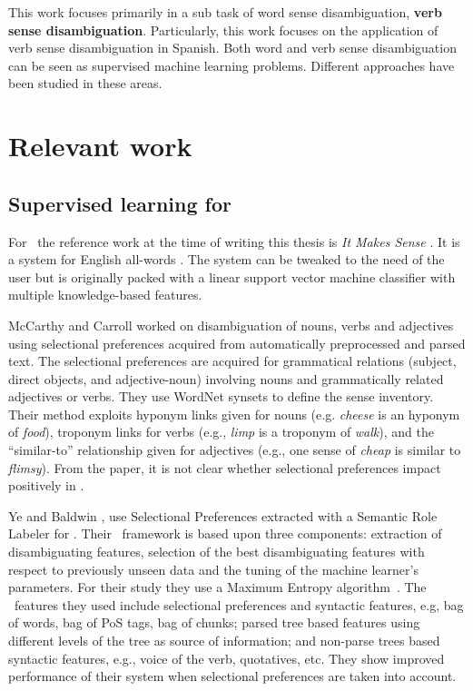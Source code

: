 This work focuses primarily in a sub task of word sense disambiguation, {\bf
verb sense disambiguation}. Particularly, this work focuses on the application
of verb sense disambiguation in Spanish. Both word and verb sense
disambiguation can be seen as supervised machine learning problems. Different
approaches have been studied in these areas.

\section{Relevant work}\label{sec:domain_background:previous}

\subsection{Supervised learning for
\wsd}\label{sec:domain_background:supervised}

For \wsd~the reference work at the time of writing this thesis is {\em It Makes
Sense} \cite{Zhong:2010:MSW:1858933.1858947}. It is a system for English
all-words \wsd. The system can be tweaked to the need of the user but is
originally packed with a linear support vector machine classifier with multiple
knowledge-based features.

McCarthy and Carroll \cite{McCarthy2003a} worked on disambiguation of nouns,
verbs and adjectives using selectional preferences acquired from automatically
preprocessed and parsed text. The selectional preferences are acquired for
grammatical relations (subject, direct objects, and adjective-noun) involving
nouns and grammatically related adjectives or verbs. They use WordNet synsets
to define the sense inventory. Their method exploits hyponym links given for
nouns (e.g. {\em cheese} is an hyponym of {\em food}), troponym links for verbs
(e.g., {\em limp} is a troponym of {\em walk}), and the ``similar-to''
relationship given for adjectives (e.g., one sense of {\em cheap} is similar to
{\em flimsy}). From the paper, it is not clear whether selectional preferences
impact positively in \vsd.

Ye and Baldwin \cite{Ye:2006:ALTA2006}, use Selectional Preferences extracted
with a Semantic Role Labeler for \vsd. Their \vsd~framework is based upon three
components: extraction of disambiguating features, selection of the best
disambiguating features with respect to previously unseen data and the tuning
of the machine learner's parameters. For their study they use a Maximum Entropy
algorithm~\cite{Berger:1996:MEA:234285.234289}. The \vsd~features they used
include selectional preferences and syntactic features, e.g, bag of words, bag
of PoS tags, bag of chunks; parsed tree based features using different levels
of the tree as source of information; and non-parse trees based syntactic
features, e.g., voice of the verb, quotatives, etc. They show improved
performance of their system when selectional preferences are taken into
account.

